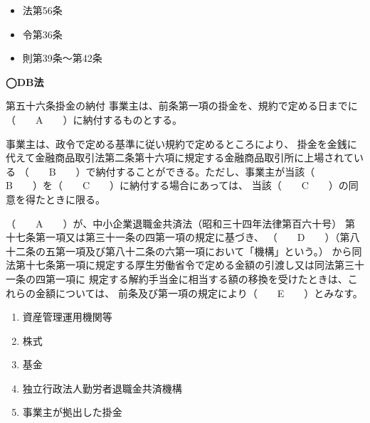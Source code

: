 \begin{InyouJobunbox}
  \begin{itemize}
    \item 法第56条
    \item 令第36条
    \item 則第39条〜第42条
  \end{itemize}
\end{InyouJobunbox}


\begin{fillblank}[数理人試験 H26 問題1(3)c,d,e,f \& 年金1 2021 問題1(1)B]
  \noindent \textbf{◯DB法}
  \begin{lawstructure}
    \begin{lawarticle}{第五十六条}{掛金の納付}
      事業主は、前条第一項の掛金を、規約で定める日までに（　　A　　）に納付するものとする。

      事業主は、政令で定める基準に従い規約で定めるところにより、
      掛金を金銭に代えて金融商品取引法第二条第十六項に規定する金融商品取引所に上場されている
      （　　B　　）で納付することができる。ただし、事業主が当該（　　B　　）を（　　C　　）に納付する場合にあっては、
      当該（　　C　　）の同意を得たときに限る。
      
      （　　A　　）が、中小企業退職金共済法（昭和三十四年法律第百六十号）
      第十七条第一項又は第三十一条の四第一項の規定に基づき、
      （　　D　　）（第八十二条の五第一項及び第八十二条の六第一項において「機構」という。）
      から同法第十七条第一項に規定する厚生労働省令で定める金額の引渡し又は同法第三十一条の四第一項に
      規定する解約手当金に相当する額の移換を受けたときは、これらの金額については、
      前条及び第一項の規定により（　　E　　）とみなす。

    \end{lawarticle}
  \end{lawstructure}
\end{fillblank}


\begin{answerbox}
    \begin{enumerate}[A: ]
    \item 資産管理運用機関等
    \item 株式
    \item 基金
    \item 独立行政法人勤労者退職金共済機構
    \item 事業主が拠出した掛金
  \end{enumerate}
\end{answerbox}

